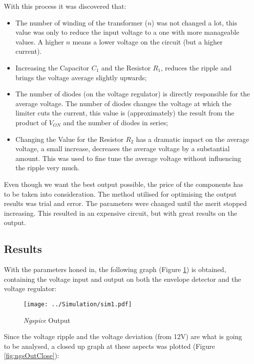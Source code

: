 With this process it was discovered that:
\begin{itemize}
    \item The number of winding of the transformer ($n$) was not changed a lot, this value was only to reduce the input voltage to a one with more manageable values. A higher $n$ means a lower voltage on the circuit (but a higher current).
    \item Increasing the Capacitor $C_1$ and the Resistor $R_1$, reduces the ripple and brings the voltage average slightly upwards;
    \item The number of diodes (on the voltage regulator) is directly responsible for the average voltage. The number of diodes changes the voltage at which the limiter cuts the current, this value is (approximately) the result from the product of $V_{ON}$ and the number of diodes in series;
    \item Changing the Value for the Resistor $R_2$ has a dramatic impact on the average voltage, a small increase, decreases the average voltage by a substantial amount. This was used to fine tune the average voltage without influencing the ripple very much.
\end{itemize}

Even though we want the best output possible, the price of the components has to be taken into consideration. 
The method utilised for optimising the output results was trial and error. The parameters were changed until the merit stopped increasing. This resulted in an expensive circuit, but with great results on the output.

\subsection{Results}

\indent

With the parameters honed in, the following graph (Figure \ref{fig:ngsOut}) is obtained, containing the voltage input and output on both the envelope detector and the voltage regulator:

\begin{figure}[H]
    \centering
    \texttt{[image: ../Simulation/sim1.pdf]}
    \caption{{\it Ngspice} Output}
    \label{fig:ngsOut}
\end{figure}

Since the voltage ripple and the voltage deviation (from 12V) are what is going to be analysed, a closed up graph at these aspects was plotted (Figure \ref{fig:ngsOutClose}): 

